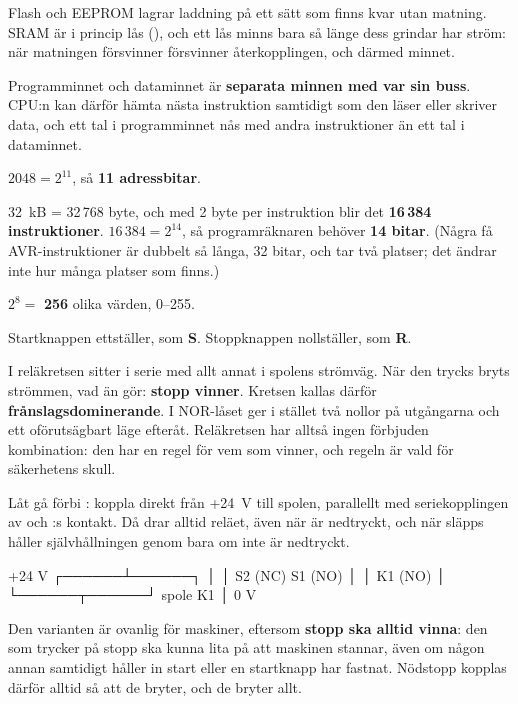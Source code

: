 Flash och EEPROM lagrar laddning på ett sätt som finns kvar utan matning. SRAM är i princip
lås (), och ett lås minns bara så länge dess grindar har ström: när matningen
försvinner försvinner återkopplingen, och därmed minnet.

Programminnet och dataminnet är \textbf{separata minnen med var sin buss}. CPU:n kan därför
hämta nästa instruktion samtidigt som den läser eller skriver data, och ett tal i programminnet nås
med andra instruktioner än ett tal i dataminnet.

$2048 = 2^{11}$, så \textbf{11 adressbitar}.

32~kB = 32\,768 byte, och med 2 byte per instruktion blir det \textbf{16\,384
instruktioner}. $16\,384 = 2^{14}$, så programräknaren behöver \textbf{14 bitar}. (Några få
AVR-instruktioner är dubbelt så långa, 32 bitar, och tar två platser; det ändrar inte hur många
platser som finns.)

$2^8 =$ \textbf{256} olika värden, 0--255.

Startknappen  ettställer, som \textbf{S}. Stoppknappen  nollställer, som
\textbf{R}.

I reläkretsen sitter  i serie med allt annat i spolens strömväg. När den trycks
bryts strömmen, vad  än gör: \textbf{stopp vinner}. Kretsen kallas därför
\textbf{frånslagsdominerande}. I NOR-låset ger  i stället två nollor på utgångarna
och ett oförutsägbart läge efteråt. Reläkretsen har alltså ingen förbjuden kombination: den har en
regel för vem som vinner, och regeln är vald för säkerhetens skull.

Låt  gå förbi : koppla  direkt från +24~V till spolen,
parallellt med seriekopplingen av  och :s kontakt. Då drar  alltid
reläet, även när  är nedtryckt, och när  släpps håller självhållningen genom
 bara om  inte är nedtryckt.

\begin{textdrawing}
            +24 V
       ┌──────┴──────┐
       │             │
   S2 (NC)       S1 (NO)
       │             │
   K1 (NO)           │
       └──────┬──────┘
         spole K1
              │
             0 V
\end{textdrawing}

\noindent Den varianten är ovanlig för maskiner, eftersom \textbf{stopp ska alltid vinna}: den som
trycker på stopp ska kunna lita på att maskinen stannar, även om någon annan samtidigt håller in
start eller en startknapp har fastnat. Nödstopp kopplas därför alltid så att de bryter, och de
bryter allt.
